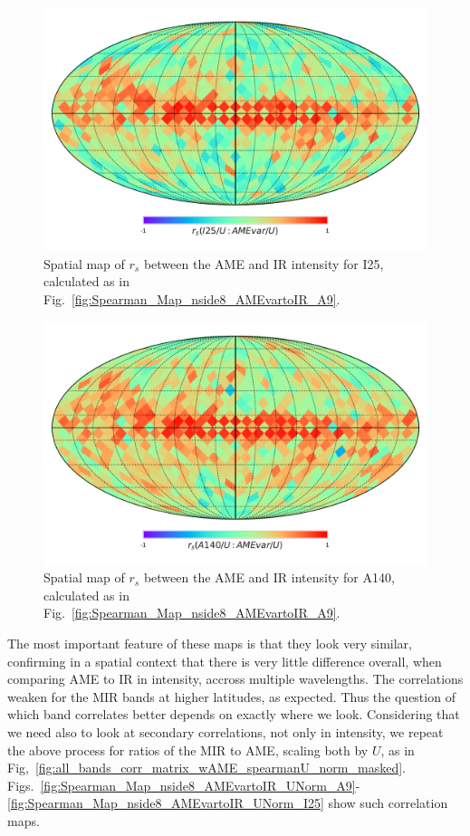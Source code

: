       \begin{figure}
        \includegraphics[width=\textwidth/2]{../Plots/Allsky_Corr/Spearman_Map_nside8_I25toAMEvar.pdf}
        \centering
        \caption{Spatial map of $r_{s}$ between the AME and IR intensity for I25, calculated as in Fig.~\ref{fig:Spearman_Map_nside8_AMEvartoIR_A9}.}
        \label{fig:Spearman_Map_nside8_AMEvartoIR_I25}
      \end{figure}
      \begin{figure}
        \includegraphics[width=\textwidth/2]{../Plots/Allsky_Corr/Spearman_Map_nside8_A140toAMEvar.pdf}
        \centering
        \caption{Spatial map of $r_{s}$ between the AME and IR intensity for A140, calculated as in Fig.~\ref{fig:Spearman_Map_nside8_AMEvartoIR_A9}.}
        \label{fig:Spearman_Map_nside8_AMEvartoIR_A140}
      \end{figure}
  The most important feature of these maps is that they look very similar, confirming in a spatial context that there is very little difference overall, when comparing AME to IR in intensity, accross multiple wavelengths. The correlations weaken for the MIR bands at higher latitudes, as expected. Thus the question of which band correlates better depends on exactly where we look. Considering that we need also to look at secondary correlations, not only in intensity, we repeat the above process for ratios of the MIR to AME, scaling both by $U$, as in Fig,~\ref{fig:all_bands_corr_matrix_wAME_spearmanU_norm_masked}.  Figs.~\ref{fig:Spearman_Map_nside8_AMEvartoIR_UNorm_A9}-\ref{fig:Spearman_Map_nside8_AMEvartoIR_UNorm_I25} show such correlation maps.
